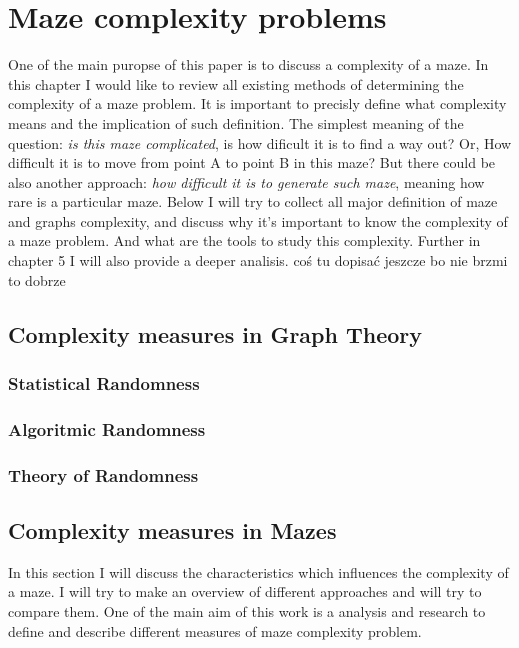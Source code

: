 \chapter{Maze complexity problems}\label{cha:background}
One of the main puropse of this paper is to discuss a complexity of a maze. In this chapter I would like to review all existing methods of determining the complexity of a maze problem.
It is important to precisly define what complexity means and the implication of such definition. The simplest meaning of the question: \textit{is this maze complicated}, is how dificult it is to find a way out? Or, How difficult it is to move from point A to point B in this maze?
But there could be also another approach: \textit{how difficult it is to generate such maze}, meaning how rare is a particular maze. Below I will try to collect all major definition of maze and graphs complexity, and discuss why it's important to know the complexity of a maze problem. 
And what are the tools to study this complexity. Further in chapter 5 I will also provide a deeper analisis. {coś tu dopisać jeszcze bo nie brzmi to dobrze }
\section{Complexity measures in Graph Theory}
\subsection{Statistical Randomness}
\subsection{Algoritmic Randomness}
\subsection{Theory of Randomness}
\section{Complexity measures in Mazes}
In this section I will discuss the characteristics which influences the complexity of a maze. I will try to make an overview of different approaches and will try to compare them. 
One of the main aim of this work is a analysis and research to define and describe different measures of maze complexity problem. 
